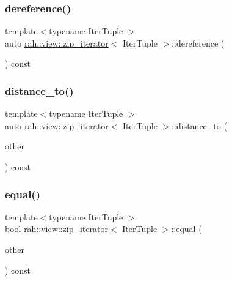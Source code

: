 \subsubsection{\texorpdfstring{dereference()}{dereference()}}
{\footnotesize\ttfamily template$<$typename Iter\+Tuple $>$ \\
auto \mbox{\hyperlink{structrah_1_1view_1_1zip__iterator}{rah\+::view\+::zip\+\_\+iterator}}$<$ Iter\+Tuple $>$\+::dereference (\begin{DoxyParamCaption}{ }\end{DoxyParamCaption}) const\hspace{0.3cm}{\ttfamily [inline]}}

\mbox{\label{structrah_1_1view_1_1zip__iterator_a01c298bede994df318d47205c50cc461}} 
\subsubsection{\texorpdfstring{distance\_to()}{distance\_to()}}
{\footnotesize\ttfamily template$<$typename Iter\+Tuple $>$ \\
auto \mbox{\hyperlink{structrah_1_1view_1_1zip__iterator}{rah\+::view\+::zip\+\_\+iterator}}$<$ Iter\+Tuple $>$\+::distance\+\_\+to (\begin{DoxyParamCaption}\item[{\mbox{\hyperlink{structrah_1_1view_1_1zip__iterator}{zip\+\_\+iterator}}$<$ Iter\+Tuple $>$}]{other }\end{DoxyParamCaption}) const\hspace{0.3cm}{\ttfamily [inline]}}

\mbox{\label{structrah_1_1view_1_1zip__iterator_ab8712d7266cdc63143e61841fa371179}} 
\subsubsection{\texorpdfstring{equal()}{equal()}}
{\footnotesize\ttfamily template$<$typename Iter\+Tuple $>$ \\
bool \mbox{\hyperlink{structrah_1_1view_1_1zip__iterator}{rah\+::view\+::zip\+\_\+iterator}}$<$ Iter\+Tuple $>$\+::equal (\begin{DoxyParamCaption}\item[{\mbox{\hyperlink{structrah_1_1view_1_1zip__iterator}{zip\+\_\+iterator}}$<$ Iter\+Tuple $>$}]{other }\end{DoxyParamCaption}) const\hspace{0.3cm}{\ttfamily [inline]}}

